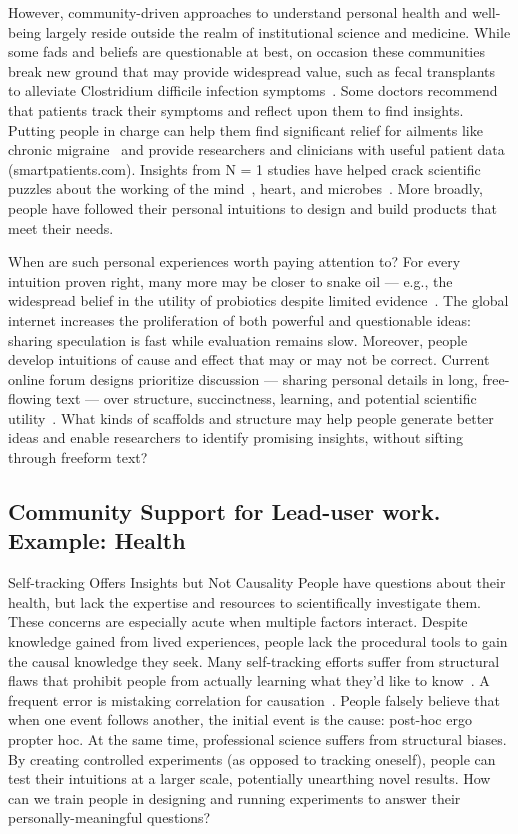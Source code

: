 However, community-driven approaches to understand personal
health and well-being largely reside outside the realm
of institutional science and medicine. While some fads and
beliefs are questionable at best, on occasion these communities
break new ground that may provide widespread value,
such as fecal transplants to alleviate Clostridium difficile infection
symptoms~\cite{Brandt2012}. Some doctors recommend that patients
track their symptoms and reflect upon them to find
insights. Putting people in charge can help them find significant
relief for ailments like chronic migraine~\cite{Gawande2017} and provide
researchers and clinicians with useful patient data
(smartpatients.com). Insights from N = 1 studies have helped
crack scientific puzzles about the working of the mind~\cite{V.S.Ramachandran1998},
heart, and microbes~\cite{Weisse2012}. More broadly, people have
followed their personal intuitions to design and build
products that meet their needs.

When are such personal experiences worth paying attention
to? For every intuition proven right, many more may be
closer to snake oil — e.g., the widespread belief in the utility
of probiotics despite limited evidence~\cite{Bonifait2009}. The global internet
increases the proliferation of both powerful and questionable
ideas: sharing speculation is fast while evaluation remains
slow. Moreover, people develop intuitions of cause and effect
that may or may not be correct. Current online forum
designs prioritize discussion — sharing personal details in
long, free-flowing text — over structure, succinctness, learning,
and potential scientific utility~\cite{Thomas2002}. What kinds of scaffolds
and structure may help people generate better ideas and
enable researchers to identify promising insights, without
sifting through freeform text?

\subsection{Community Support for Lead-user work. Example: Health}
Self-tracking Offers Insights but Not Causality
People have questions about their health, but lack the expertise and resources to scientifically
investigate them. These concerns are especially acute when multiple factors interact. Despite
knowledge gained from lived experiences, people lack the procedural tools to gain the causal
knowledge they seek. Many self-tracking efforts suffer from structural flaws that prohibit people
from actually learning what they’d like to know~\cite{Choe2014, Li2010a}. A frequent error is mistaking correlation
for causation~\cite{Munroe2009}. People falsely believe that when one event follows another, the initial event is
the cause: post-hoc ergo propter hoc. At the same time, professional science suffers from structural
biases. By creating controlled experiments (as opposed to tracking oneself), people can test their
intuitions at a larger scale, potentially unearthing novel results. How can we train people in designing
and running experiments to answer their personally-meaningful questions?

